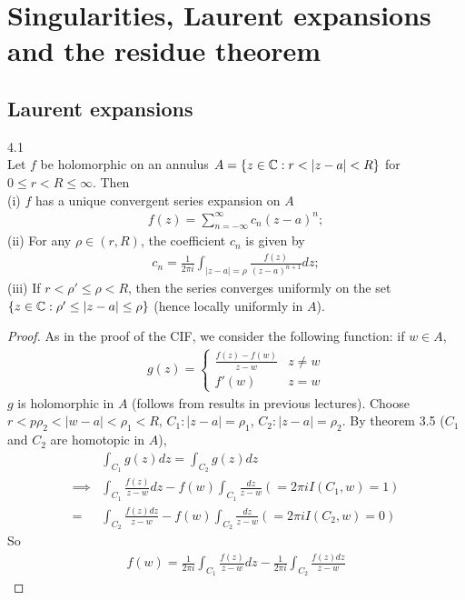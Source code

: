 \documentclass[a4paper]{article}
\begin{document}
\newpage

\section{Singularities, Laurent expansions and the residue theorem}

\subsection{Laurent expansions}

\begin{thm} 4.1\\
Let $f$ be holomorphic on an annulus $A = \{z \in \C: r<|z-a|<R\}$ for $0\leq r < R \leq \infty$. Then\\
(i) $f$ has a unique convergent series expansion on $A$
\begin{equation*}
\begin{aligned}
f(z) = \sum_{n=-\infty}^\infty c_n(z-a)^n;
\end{aligned}
\end{equation*}
(ii) For any $\rho \in (r,R)$, the coefficient $c_n$ is given by
\begin{equation*}
\begin{aligned}
c_n = \frac{1}{2\pi i}\int_{|z-a|=\rho} \frac{f(z)}{(z-a)^{n+1}} dz;
\end{aligned}
\end{equation*}
(iii) If $r < \rho' \leq \rho < R$, then the series converges uniformly on the set $\{z \in \mathbb{C}: \rho'\leq |z-a|\leq \rho\}$ (hence locally uniformly in $A$).
\begin{proof}
As in the proof of the CIF, we consider the following function: if $w \in A$,
\begin{equation*}
\begin{aligned}
g(z) = \left\{\begin{array}{ll}
\frac{f(z)-f(w)}{z-w} & z \neq w\\
f'(w) & z = w
\end{array}\right.
\end{aligned}
\end{equation*}
$g$ is holomorphic in $A$ (follows from results in previous lectures). Choose $r<p\rho_2 < |w-a|<\rho_1<R$, $C_1:|z-a|=\rho_1$, $C_2:|z-a| = \rho_2$. By theorem 3.5 ($C_1$ and $C_2$ are homotopic in $A$),
\begin{equation*}
\begin{aligned}
&\int_{C_1} g(z) dz =\int_{C_2} g(z) dz\\
\implies &\int_{C_1} \frac{f(z)}{z-w} dz - f(w) \int_{C_1} \frac{dz}{z-w} (=2\pi i I(C_1,w)=1) \\
= &\int_{C_2}\frac{f(z)dz}{z-w} - f(w) \int_{C_2}\frac{dz}{z-w}(=2\pi i I(C_2,w)=0)
\end{aligned}
\end{equation*}
So
\begin{equation*}
\begin{aligned}
f(w) = \frac{1}{2\pi i}\int_{C_1} \frac{f(z)}{z-w}dz - \frac{1}{2\pi i}\int_{C_2} \frac{f(z) dz}{z-w}
\end{aligned}
\end{equation*}


\end{proof}
\end{thm}
\end{document}
